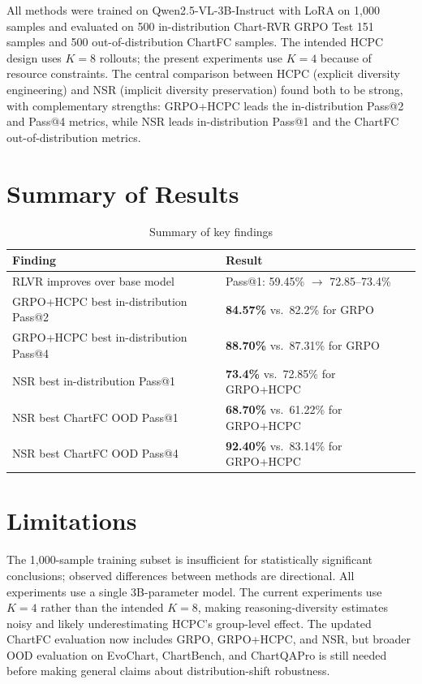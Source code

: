 \documentclass{iutbscthesis}
\begin{document}
All methods were trained on Qwen2.5-VL-3B-Instruct with LoRA on 1,000 samples and evaluated on 500 in-distribution Chart-RVR GRPO Test 151 samples and 500 out-of-distribution ChartFC samples. The intended HCPC design uses $K=8$ rollouts; the present experiments use $K=4$ because of resource constraints. The central comparison between HCPC (explicit diversity engineering) and NSR (implicit diversity preservation) found both to be strong, with complementary strengths: GRPO+HCPC leads the in-distribution Pass@2 and Pass@4 metrics, while NSR leads in-distribution Pass@1 and the ChartFC out-of-distribution metrics.

\section{Summary of Results}

\begin{table}[H]
    \centering
    \begin{tabular}{ll}
        \toprule
        Finding & Result \\
        \midrule
        RLVR improves over base model & Pass@1: 59.45\% $\rightarrow$ 72.85--73.4\% \\
        GRPO+HCPC best in-distribution Pass@2 & \textbf{84.57\%} vs.\ 82.2\% for GRPO \\
        GRPO+HCPC best in-distribution Pass@4 & \textbf{88.70\%} vs.\ 87.31\% for GRPO \\
        NSR best in-distribution Pass@1 & \textbf{73.4\%} vs.\ 72.85\% for GRPO+HCPC \\
        NSR best ChartFC OOD Pass@1 & \textbf{68.70\%} vs.\ 61.22\% for GRPO+HCPC \\
        NSR best ChartFC OOD Pass@4 & \textbf{92.40\%} vs.\ 83.14\% for GRPO+HCPC \\
        \bottomrule
    \end{tabular}
    \caption{Summary of key findings}
    \label{tab:summary}
\end{table}

\section{Limitations}

The 1,000-sample training subset is insufficient for statistically significant conclusions; observed differences between methods are directional. All experiments use a single 3B-parameter model. The current experiments use $K=4$ rather than the intended $K=8$, making reasoning-diversity estimates noisy and likely underestimating HCPC's group-level effect. The updated ChartFC evaluation now includes GRPO, GRPO+HCPC, and NSR, but broader OOD evaluation on EvoChart, ChartBench, and ChartQAPro is still needed before making general claims about distribution-shift robustness.
\end{document}
